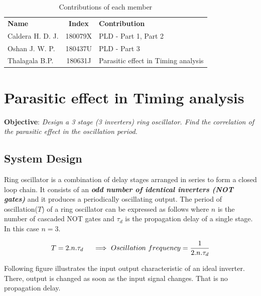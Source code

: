 \documentclass[a4paper,11pt]{article}%
\begin{document}


\tableofcontents
\vspace{4cm}
\begin{table}[H]
		\centering
		\begin{tabular}{l c l}
		\textbf{Name} & \textbf{Index} & \textbf{Contribution}\\

	Caldera H. D. J. &  180079X& PLD - Part 1, Part 2\\
	Oshan J. W. P.    & 180437U& PLD - Part 3 \\
	Thalagala B.P. & 180631J & Parasitic effect in Timing analysis \\


		\end{tabular}
		\caption{Contributions of each member}
\end{table}




\pagebreak
\section{Parasitic effect in Timing analysis}
\textbf{Objective}: \textit{Design a 3 stage (3 inverters) ring oscillator. Find the correlation of the parasitic effect in the oscillation period.}

\subsection{System Design}
Ring oscillator is a combination of delay stages arranged in series to form a closed loop chain. It consists of an \textbf{\textit{odd number of identical inverters (NOT gates)}} and it produces a  periodically oscillating output. The period of oscillation($T$) of a ring oscillator can be expressed as follows where $n$ is the number of cascaded NOT gates and $\tau_{d}$ is the propagation delay of a single stage\cite{rosci}. In this case $n = 3$.

\[
T = 2.n.\tau_{d} \hspace{5mm}\Longrightarrow ~ Oscillation~frequency = \frac{1}{2.n.\tau_{d}}
\]
\vspace{5mm}

Following figure illustrates the input output characteristic of an ideal inverter. There, output is changed as soon as the input signal changes. That is no propagation delay.
\end{document}
